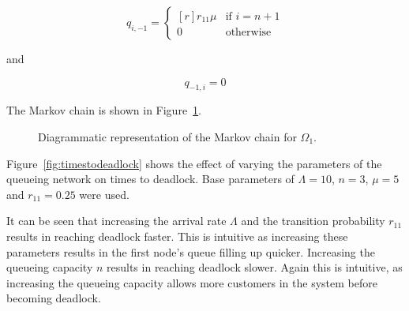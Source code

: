 \documentclass{article}
\begin{document}
\begin{equation}
  q_{i, -1} = \left\{
  \begin{matrix*}[ r ]
    r_{11}\mu & \text{if } i = n + 1 \\
    0 & \text{otherwise}
  \end{matrix*}
  \right.
\end{equation}

and

\begin{equation}
  q_{-1, i} = 0
\end{equation}

The Markov chain is shown in Figure~\ref{fig:1nodeMC}.

\begin{figure}[!htbp]
    
    \caption{Diagrammatic representation of the Markov chain for $\Omega_1$.}
    \label{fig:1nodeMC}
\end{figure}

Figure~\ref{fig:timestodeadlock} shows the effect of varying the parameters of the queueing network on times to deadlock.
Base parameters of $\Lambda = 10$, $n = 3$, $\mu = 5$ and $r_{11} = 0.25$ were used.

It can be seen that increasing the arrival rate $\Lambda$ and the transition probability $r_{11}$ results in reaching deadlock faster.
This is intuitive as increasing these parameters results in the first node's queue filling up quicker.
Increasing the queueing capacity $n$ results in reaching deadlock slower.
Again this is intuitive, as increasing the queueing capacity allows more customers in the system before becoming deadlock.
\end{document}
